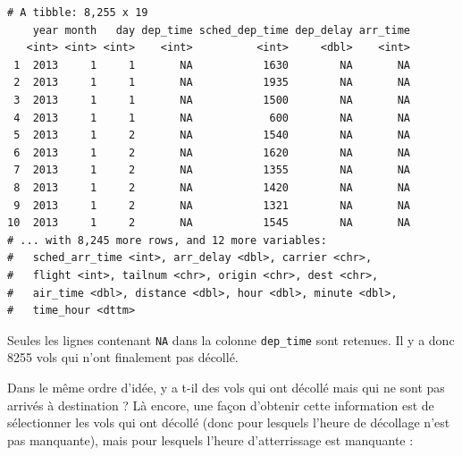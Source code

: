 \documentclass[a4paperpaper,]{article}
\newenvironment{Shaded}{\begin{snugshade}}{\end{snugshade}}
\newcommand{\KeywordTok}[1]{\textcolor[rgb]{0.12,0.11,0.11}{\textbf{#1}}}
\newcommand{\NormalTok}[1]{\textcolor[rgb]{0.12,0.11,0.11}{#1}}
\newcommand{\OperatorTok}[1]{\textcolor[rgb]{0.12,0.11,0.11}{#1}}
\newcommand{\StringTok}[1]{\textcolor[rgb]{0.75,0.01,0.01}{#1}}
\begin{document}
\begin{verbatim}
# A tibble: 8,255 x 19
    year month   day dep_time sched_dep_time dep_delay arr_time
   <int> <int> <int>    <int>          <int>     <dbl>    <int>
 1  2013     1     1       NA           1630        NA       NA
 2  2013     1     1       NA           1935        NA       NA
 3  2013     1     1       NA           1500        NA       NA
 4  2013     1     1       NA            600        NA       NA
 5  2013     1     2       NA           1540        NA       NA
 6  2013     1     2       NA           1620        NA       NA
 7  2013     1     2       NA           1355        NA       NA
 8  2013     1     2       NA           1420        NA       NA
 9  2013     1     2       NA           1321        NA       NA
10  2013     1     2       NA           1545        NA       NA
# ... with 8,245 more rows, and 12 more variables:
#   sched_arr_time <int>, arr_delay <dbl>, carrier <chr>,
#   flight <int>, tailnum <chr>, origin <chr>, dest <chr>,
#   air_time <dbl>, distance <dbl>, hour <dbl>, minute <dbl>,
#   time_hour <dttm>
\end{verbatim}

Seules les lignes contenant \texttt{NA} dans la colonne \texttt{dep\_time} sont retenues. Il y a donc 8255 vols qui n'ont finalement pas décollé.

Dans le même ordre d'idée, y a t-il des vols qui ont décollé mais qui ne sont pas arrivés à destination ? Là encore, une façon d'obtenir cette information est de sélectionner les vols qui ont décollé (donc pour lesquels l'heure de décollage n'est pas manquante), mais pour lesquels l'heure d'atterrissage est manquante :

\begin{Shaded}
\end{Shaded}
\end{document}
